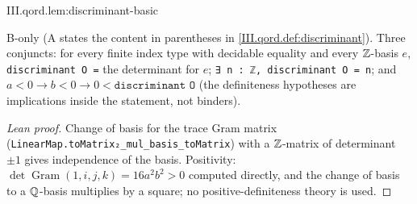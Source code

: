 \begin{lemma}
\bonly
{}
\end{lemma}
\begin{tfformal}{III.qord.lem:discriminant-basic}
\begin{tffidelity}
B-only (A states the content in parentheses in \cref{III.qord.def:discriminant}). Three conjuncts: for every finite index type with decidable equality and every $\mathbb{Z}$-basis $e$, \texttt{discriminant O =} the determinant for $e$; \texttt{∃ n : ℤ, discriminant O = n}; and $a<0\to b<0\to0<\texttt{discriminant O}$ (the definiteness hypotheses are implications inside the statement, not binders).
\end{tffidelity}
\end{tfformal}
\begin{proof}[Lean proof]
Change of basis for the trace Gram matrix (\texttt{LinearMap.toMatrix₂\_mul\_basis\_toMatrix}) with a $\mathbb{Z}$-matrix of determinant $\pm1$ gives independence of the basis. Positivity: $\det\operatorname{Gram}(1,i,j,k)=16a^2b^2>0$ computed directly, and the change of basis to a $\mathbb{Q}$-basis multiplies by a square; no positive-definiteness theory is used.
\end{proof}

